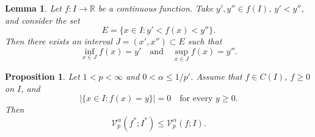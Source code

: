 \documentclass[10pt,a4paper]{amsart}
\newtheorem{lem}{Lemma}
\newtheorem{prop}{Proposition}
\begin{document}
\begin{lem}
    \label{mainLemma}
    Let $f:I\rightarrow\mathbb{R}$ be a continuous function. Take $y',y''\in f(I)$, $y'<y''$, and consider the set
    $$
    E=\{x\in I:y'<f(x)<y''\}.
    $$
    Then there exists an interval $J=(x',x'')\subset E$ such that
    \begin{equation}
    \label{extremal}
        \inf_{x\in J}f(x)=y'\quad\text{and}\quad\sup_{x\in J}f(x)=y''.
    \end{equation}
\end{lem}

\begin{prop}
    \label{simplePS}
    Let $1<p<\infty$ and $0<\alpha\le 1/p'$. Assume that $f\in C(I)$, $f\ge0$ on $I$, and 
    \begin{equation}
        \label{simplePSA3}
        |\{x\in I:f(x)=y\}|=0\quad\text{for every } y\ge0.
    \end{equation}
    Then 
    \begin{equation}
        \label{simplePS-ineq}
        \mathcal{V}_p^\alpha(f^*;I^*)\le\mathcal{V}_p^\alpha(f;I).
    \end{equation}
\end{prop}
\end{document}
